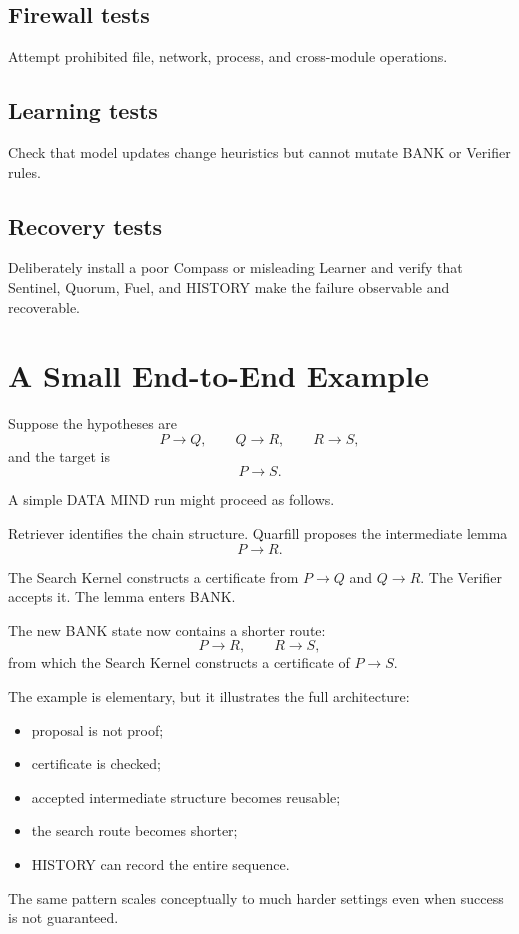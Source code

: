 \documentclass[11pt]{article}
\begin{document}
\subsection{Firewall tests}
Attempt prohibited file, network, process, and cross-module operations.

\subsection{Learning tests}
Check that model updates change heuristics but cannot mutate BANK or Verifier rules.

\subsection{Recovery tests}
Deliberately install a poor Compass or misleading Learner and verify that Sentinel, Quorum, Fuel, and HISTORY make the failure observable and recoverable.

\section{A Small End-to-End Example}

Suppose the hypotheses are
\[
P\to Q,
\qquad
Q\to R,
\qquad
R\to S,
\]
and the target is
\[
P\to S.
\]

A simple DATA MIND run might proceed as follows.

Retriever identifies the chain structure. Quarfill proposes the intermediate lemma
\[
P\to R.
\]

The Search Kernel constructs a certificate from $P\to Q$ and $Q\to R$. The Verifier accepts it. The lemma enters BANK.

The new BANK state now contains a shorter route:
\[
P\to R,
\qquad
R\to S,
\]
from which the Search Kernel constructs a certificate of $P\to S$.

The example is elementary, but it illustrates the full architecture:
\begin{itemize}
\item proposal is not proof;
\item certificate is checked;
\item accepted intermediate structure becomes reusable;
\item the search route becomes shorter;
\item HISTORY can record the entire sequence.
\end{itemize}

The same pattern scales conceptually to much harder settings even when success is not guaranteed.
\end{document}
